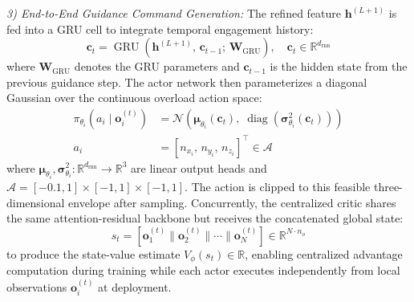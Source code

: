 \documentclass[lettersize,journal]{IEEEtran}
\providecommand{\DIFadd}[1]{{\protect\color{blue} #1}} %
\providecommand{\DIFdel}[1]{} %
\providecommand{\DIFaddbegin}{} %
\providecommand{\DIFaddend}{} %
\providecommand{\DIFdelbegin}{} %
\providecommand{\DIFdelend}{} %
\begin{document}
\emph{3) End-to-End Guidance Command Generation:} The refined feature $\mathbf{h}^{(L+1)}$ is fed into a GRU cell to integrate temporal engagement history:
\begin{equation}
\label{eq:gru}
\mathbf{c}_t = \operatorname{GRU}\!\left(\mathbf{h}^{(L+1)},\, \mathbf{c}_{t-1};\, \mathbf{W}_{\mathrm{GRU}}\right), \quad \mathbf{c}_t \in \mathbb{R}^{d_{\mathrm{rnn}}}
\end{equation}
where $\mathbf{W}_{\mathrm{GRU}}$ denotes the GRU parameters and $\mathbf{c}_{t-1}$ is the hidden state from the previous guidance step. The actor network then parameterizes a diagonal Gaussian over the continuous overload action space:
\DIFdelbegin %
\DIFdelend \DIFaddbegin \begin{equation}
\label{eq:actor_dist}
\begin{split}
\pi_{\theta_i}\!\left(a_i \mid \mathbf{o}_i^{(t)}\right) &= \mathcal{N}\!\left(\boldsymbol{\mu}_{\theta_i}(\mathbf{c}_t),\; \operatorname{diag}\!\left(\boldsymbol{\sigma}_{\theta_i}^2(\mathbf{c}_t)\right)\right) \\
a_i &= [n_{x_i},\, n_{y_i},\,n_{z_i}]^\top \in \mathcal{A}
\end{split}
\end{equation}\DIFaddend 
where \DIFdelbegin \DIFdel{$\boldsymbol{\mu}_{\theta_i}, \boldsymbol{\sigma}_{\theta_i}^2: \mathbb{R}^{d_{\mathrm{rnn}}} \to \mathbb{R}^2$ }\DIFdelend \DIFaddbegin \DIFadd{$\boldsymbol{\mu}_{\theta_i}, \boldsymbol{\sigma}_{\theta_i}^2:
\mathbb{R}^{d_{\mathrm{rnn}}} \to \mathbb{R}^3$ }\DIFaddend are linear output heads \DIFaddbegin \DIFadd{and
\(\mathcal A=[-0.1,1]\times[-1,1]\times[-1,1]\)}\DIFaddend . The action is clipped to
\DIFdelbegin \DIFdel{the feasible envelope $\mathcal{A}$ }\DIFdelend \DIFaddbegin \DIFadd{this feasible three-dimensional envelope }\DIFaddend after sampling. Concurrently, the
centralized critic shares the same attention-residual backbone but receives the
concatenated global state:
\begin{equation}
\label{eq:critic_input}
s_t = \left[\mathbf{o}_1^{(t)} \| \mathbf{o}_2^{(t)} \| \cdots \| \mathbf{o}_N^{(t)}\right] \in \mathbb{R}^{N \cdot n_o}
\end{equation}
to produce the state-value estimate $V_\phi(s_t) \in \mathbb{R}$, enabling centralized advantage computation during training while each actor executes independently from local observations $\mathbf{o}_i^{(t)}$ at deployment.
\end{document}

